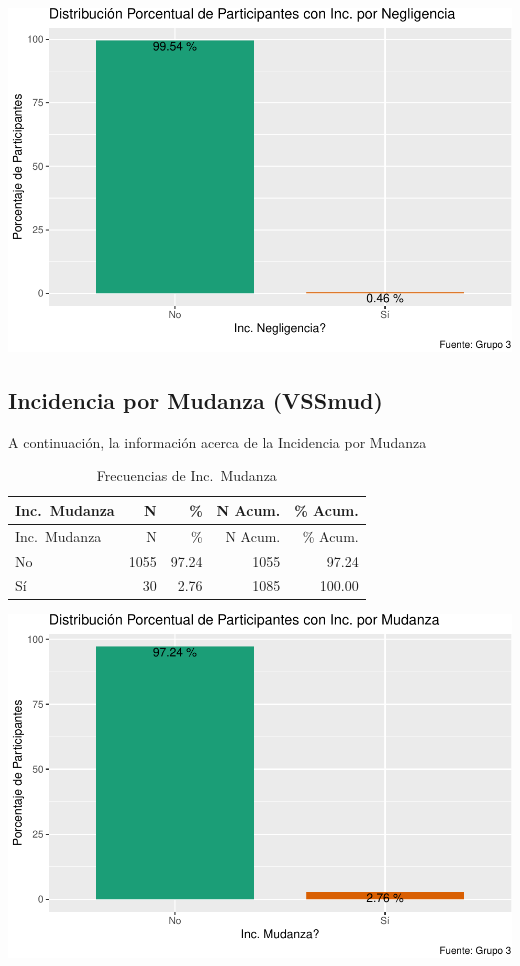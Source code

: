 \documentclass[
]{article}
\begin{document}
\includegraphics{Info_Dinix_02_files/figure-latex/30_VSSnegl-1.pdf}

\subsection{Incidencia por Mudanza
(VSSmud)}\label{incidencia-por-mudanza-vssmud}

A continuación, la información acerca de la Incidencia por Mudanza

\begin{longtable}[]{@{}lrrrr@{}}
\caption{Frecuencias de Inc.~Mudanza}\tabularnewline
\toprule\noalign{}
Inc.~Mudanza & N & \% & N Acum. & \% Acum. \\
\midrule\noalign{}
\endfirsthead
\toprule\noalign{}
Inc.~Mudanza & N & \% & N Acum. & \% Acum. \\
\midrule\noalign{}
\endhead
\bottomrule\noalign{}
\endlastfoot
No & 1055 & 97.24 & 1055 & 97.24 \\
Sí & 30 & 2.76 & 1085 & 100.00 \\
\end{longtable}

\includegraphics{Info_Dinix_02_files/figure-latex/30_VSSmud-1.pdf}
\end{document}
